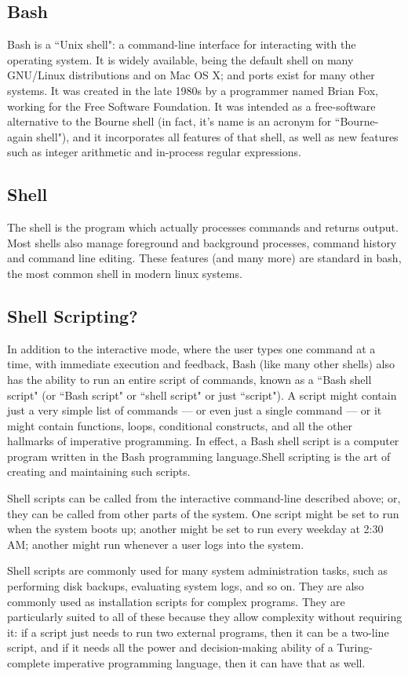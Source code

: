 \subsection{Bash}
Bash is a ``Unix shell": a command-line interface for interacting with 
the operating system. It is widely available, being the default shell 
on many GNU/Linux distributions and on Mac OS X; and ports exist for 
many other systems. It was created in the late 1980s by a programmer 
named Brian Fox, working for the Free Software Foundation. It was 
intended as a free-software alternative to the Bourne shell (in fact, 
it's name is an acronym for ``Bourne-again shell"), and it incorporates 
all features of that shell, as well as new features such as integer 
arithmetic and in-process regular expressions.
\subsection{Shell}
The shell is the program which actually processes commands and returns 
output. Most shells also manage foreground and background processes, 
command history and command line editing. These features (and many more) 
are standard in bash, the most common shell in modern linux systems.
\subsection{Shell Scripting?}
In addition to the interactive mode, where the user types one command 
at a time, with immediate execution and feedback, Bash (like many other 
shells) also has the ability to run an entire script of commands, known 
as a ``Bash shell script" (or ``Bash script" or ``shell script" or just 
``script"). A script might contain just a very simple list of commands 
— or even just a single command — or it might contain functions, loops, 
conditional constructs, and all the other hallmarks of imperative 
programming. In effect, a Bash shell script is a computer program 
written in the Bash programming language.Shell scripting is the art of 
creating and maintaining such scripts.

Shell scripts can be called from the interactive command-line described 
above; or, they can be called from other parts of the system. One script 
might be set to run when the system boots up; another might be set to 
run every weekday at 2:30 AM; another might run whenever a user logs 
into the system.

Shell scripts are commonly used for many system administration tasks, 
such as performing disk backups, evaluating system logs, and so on. 
They are also commonly used as installation scripts for complex programs. 
They are particularly suited to all of these because they allow 
complexity without requiring it: if a script just needs to run two 
external programs, then it can be a two-line script, and if it needs 
all the power and decision-making ability of a Turing-complete imperative 
programming language, then it can have that as well.


